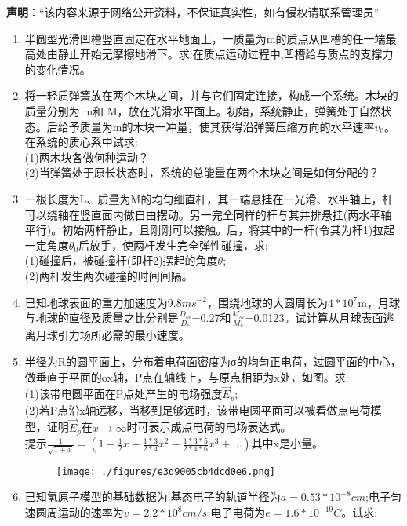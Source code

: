 
\textbf{声明}：“该内容来源于网络公开资料，不保证真实性，如有侵权请联系管理员”

\begin{enumerate}
\item 半圆型光滑凹槽竖直固定在水平地面上，一质量为m的质点从凹槽的任一端最高处由静止开始无摩擦地滑下。求:在质点运动过程中,凹槽给与质点的支撑力的变化情况。
\item 将一轻质弹簧放在两个木块之间，并与它们固定连接，构成一个系统。木块的质量分别为 m和 M，放在光滑水平面上。初始，系统静止，弹簧处于自然状态。后给予质量为m的木块一冲量，使其获得沿弹簧压缩方向的水平速率$v_0$。在系统的质心系中试求:\\
(1)两木块各做何种运动？\\
(2)当弹簧处于原长状态时，系统的总能量在两个木块之间是如何分配的？
\item 一根长度为L、质量为M的均匀细直杆，其一端悬挂在一光滑、水平轴上，杆可以绕轴在竖直面内做自由摆动。另一完全同样的杆与其并排悬挂(两水平轴平行)。初始两杆静止，且刚刚可以接触。后，将其中的一杆(令其为杆1)拉起一定角度$\theta_0$后放手，使两杆发生完全弹性碰撞，求:\\
(1)碰撞后，被碰撞杆(即杆2)摆起的角度$\theta$;\\
(2)两杆发生两次碰撞的时间间隔。
\item 已知地球表面的重力加速度为$9.8ms^{-2}$，围绕地球的大圆周长为$4*10^7$m，月球与地球的直径及质量之比分别是$\frac{D_m}{D_e}$=0.27和$\frac{M_m}{M_e}$=0.0123。试计算从月球表面逃离月球引力场所必需的最小速度。
\item 半径为R的圆平面上，分布着电荷面密度为σ的均匀正电荷，过圆平面的中心，做垂直于平面的ox轴，P点在轴线上，与原点相距为x处，如图。求:\\
(1)该带电圆平面在P点处产生的电场强度$\vec E_p$;\\
(2)若P点沿x轴远移，当移到足够远时，该带电圆平面可以被看做点电荷模型，证明$\vec E_p$在$x \to \infty$时可表示成点电荷的电场表达式。\\
提示$\displaystyle \frac{1}{\sqrt{1+x}}=(1-\frac{1}{2}x+\frac{1*3}{2*4}x^2-\frac{1*3*5}{2*4*6}x^3+\dots)$其中x是小量。
\begin{figure}[ht]
\centering
\texttt{[image: ./figures/e3d9005cb4dcd0e6.png]}
\caption{} \label{fig_SSD10_1}
\end{figure}
\item 已知氢原子模型的基础数据为:基态电子的轨道半径为$a=0.53*10^{-8}cm$;电子匀速圆周运动的速率为$v=2.2*10^8cm/s$;电子电荷为$e=1.6*10^{-19}C$。试求:\\

\end{enumerate}
